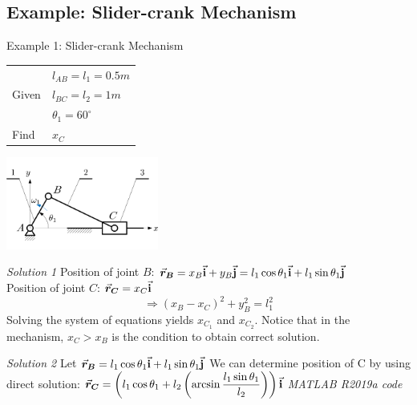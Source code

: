 \subsection{Example: Slider-crank Mechanism}

\begin{frame}
	\begin{block}{Example 1: Slider-crank Mechanism}
		\begin{table}
			\begin{minipage}{0.5\linewidth}
				\begin{tabular}{l|l}
					      & $l_{AB}=l_1=0.5m$ \\
					Given & $l_{BC}=l_2=1m$ \\
					      & $\theta_1=60^\circ$ \\ \hline
					Find  & $x_C$ \\
				\end{tabular}
			\end{minipage}\hfill
			\begin{minipage}{0.5\linewidth}
				\includegraphics[width=50mm]{images/R-RRT.png}
			\end{minipage}
		\end{table}
	\end{block}
\emph{Solution 1}\vskip2.5mm
Position of joint $B$: $\displaystyle \vec{\bm{r}}_{\bm{B}} = x_B\vec{\mathbf{i}} + y_B\vec{\mathbf{j}} = l_1\cos{\theta_1}\vec{\mathbf{i}} + l_1\sin{\theta_1}\vec{\mathbf{j}}$\\
Position of joint $C$: $\displaystyle \vec{\bm{r}}_{\bm{C}} = x_C\vec{\mathbf{i}}$
\[
\Rightarrow(x_B-x_C)^2+y_B^2=l_1^2
\]
Solving the system of equations yields $x_{C_1}$ and $x_{C_2}$. Notice that in the mechanism, $x_C>x_B$ is the condition to obtain correct solution.
\end{frame}

\begin{frame}
\emph{Solution 2}\vskip2.5mm
Let $\vec{\bm{r}}_{\bm{B}}=l_1\cos{\theta_1}\vec{\mathbf{i}}+l_1\sin{\theta_1}\vec{\mathbf{j}}$\vskip1.5mm
We can determine position of C by using direct solution:\vskip1.5mm
$\displaystyle\vec{\bm{r}}_{\bm{C}}=\left(l_1\cos{\theta_1}+l_2\left(\arcsin{\frac{l_1\sin{\theta_1}}{l_2}}\right)\right)\vec{\mathbf{i}}$\vskip7.5mm
\emph{MATLAB R2019a code}\\

\end{frame}


